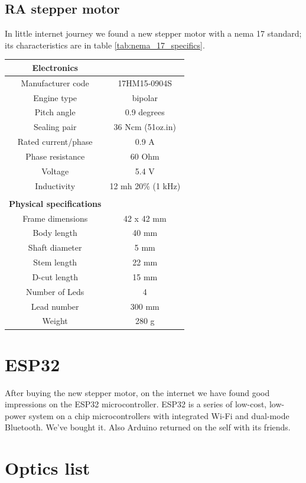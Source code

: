 \documentclass{article}
\begin{document}
\begin{multicols}{2}
        \subsection{RA stepper motor}
        In little internet journey we found a new stepper motor with a nema 17 standard; its characteristics are in table \ref{tab:nema_17_specifics}.
        \begin{minipage}{0.5\textwidth}
            \centering
            \begin{tabular}{cc}
                \textbf{Electronics}&\\
                \hline
                Manufacturer code & 17HM15-0904S\\
                Engine type & bipolar\\
                Pitch angle & 0.9 degrees\\
                Sealing pair & 36 Ncm (51oz.in)\\
                Rated current/phase & 0.9 A\\
                Phase resistance & 60 Ohm\\
                Voltage & 5.4 V\\
                Inductivity & 12 mh 20\% (1 kHz)\\
                &\\
                \textbf{Physical specifications}&\\
                \hline
                Frame dimensions & 42 x 42 mm\\
                Body length & 40 mm\\
                Shaft diameter & 5 mm\\
                Stem length & 22 mm\\
                D-cut length & 15 mm\\
                Number of Leds & 4\\
                Lead number & 300 mm\\
                Weight & 280 g\\
                \hline
            \end{tabular}
            \label{tab:nema_17_specifics}
        \end{minipage}

        \section{ESP32}
        After buying the new stepper motor, on the internet we have found good impressions on the ESP32 microcontroller.
        ESP32 is a series of low-cost, low-power system on a chip microcontrollers with integrated Wi-Fi and dual-mode Bluetooth.
        We've bought it. Also Arduino returned on the self with its friends.

        \section{Optics list}

    \end{multicols}
\end{document}
